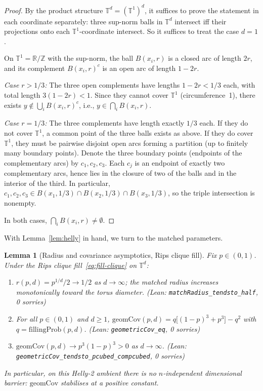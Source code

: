 \documentclass[reqno,12pt]{amsart}
\newcommand{\geomCov}{\mathrm{geomCov}}
\newcommand{\fillingP}{\mathrm{fillingProb}}
\newcommand{\TT}{\mathbb{T}}         %
\newcommand{\AddCircle}{\mathbb{T}^1}%
\newcommand{\RR}{\mathbb{R}}
\newcommand{\ZZ}{\mathbb{Z}}
\newcommand{\leanverified}[1]{\textup{(Lean: \texttt{#1}, 0 sorries)}}
\theoremstyle{plain}
\newtheorem{lemma}[theorem]{Lemma}
\theoremstyle{definition}
\theoremstyle{remark}
\begin{document}
\begin{proof}
By the product structure $\TT^d = (\AddCircle)^d$, it suffices to prove the statement in
each coordinate separately: three sup-norm balls in $\TT^d$ intersect iff their projections
onto each $\AddCircle$-coordinate intersect. So it suffices to treat the case $d = 1$.

On $\AddCircle = \RR/\ZZ$ with the sup-norm, the ball $B(x_i,r)$ is a closed arc of length
$2r$, and its complement $B(x_i,r)^c$ is an open arc of length $1-2r$.

\textit{Case $r > 1/3$:} The three open complements have lengths $1-2r < 1/3$ each, with
total length $3(1-2r) < 1$. Since they cannot cover $\AddCircle$ (circumference~1), there
exists $y \notin \bigcup_i B(x_i,r)^c$, i.e., $y \in \bigcap_i B(x_i,r)$.

\textit{Case $r = 1/3$:} The three complements have length exactly $1/3$ each. If they do
not cover $\AddCircle$, a common point of the three balls exists as above. If they do cover
$\AddCircle$, they must be pairwise disjoint open arcs forming a partition (up to finitely
many boundary points). Denote the three boundary points (endpoints of the complementary arcs)
by $c_1, c_2, c_3$. Each $c_j$ is an endpoint of exactly two complementary arcs, hence lies
in the closure of two of the balls and in the interior of the third. In particular,
$c_1, c_2, c_3 \in B(x_1, 1/3) \cap B(x_2, 1/3) \cap B(x_3, 1/3)$, so the triple
intersection is nonempty.

In both cases, $\bigcap_i B(x_i, r) \neq \emptyset$.
\end{proof}

With Lemma~\ref{lem:helly} in hand, we turn to the matched parameters.

\begin{lemma}[Radius and covariance asymptotics, Rips clique fill]\label{lem:radius-asymptotics}
Fix $p\in(0,1)$. Under the Rips clique fill~\eqref{eq:fill-clique} on $\TT^d$:
\begin{enumerate}[label=(\alph*)]
\item $r(p,d) = p^{1/d}/2\to 1/2$ as $d\to\infty$; the matched radius increases
  monotonically toward the torus diameter.
  \hfill \leanverified{matchRadius\_tendsto\_half}
\item For all $p \in (0,1)$ and $d \ge 1$,
  $\geomCov(p,d) = q\bigl[(1-p)^3 + p^3\bigr] - q^2$ with $q = \fillingP(p,d)$.
  \hfill \leanverified{geometricCov\_eq}
\item $\geomCov(p,d) \to p^3 (1-p)^3 > 0$ as $d \to \infty$.
  \hfill \leanverified{geometricCov\_tendsto\_pcubed\_compcubed}
\end{enumerate}
In particular, on this Helly-2 ambient there is no $n$-independent dimensional barrier:
$\geomCov$ stabilises at a positive constant.
\end{lemma}
\end{document}
